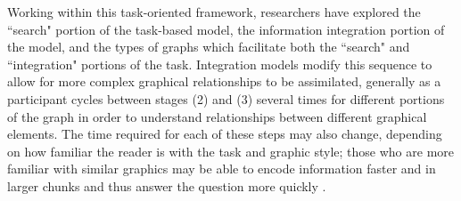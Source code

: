 \documentclass[11pt]{isuthesis}\usepackage[]{graphicx}\usepackage[]{color}
\begin{document}
Working within this task-oriented framework, researchers have explored the ``search" portion of the task-based model, the information integration portion of the model, and the types of graphs which facilitate both the ``search" and ``integration" portions of the task. Integration models modify this sequence to allow for more complex graphical relationships to be assimilated, generally as a participant cycles between stages (2) and (3) several times for different portions of the graph in order to understand relationships between different graphical elements. The time required for each of these steps may also change, depending on how familiar the reader is with the task and graphic style; those who are more familiar with similar graphics may be able to encode information faster and in larger chunks and thus answer the question more quickly \citep{carpenter1998model}. 
\end{document}
